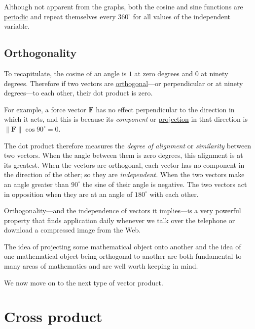 \documentclass[
  a4paper,
]{article}
\begin{document}
Although not apparent from the graphs, both the cosine and sine
functions are
\href{http://mathworld.wolfram.com/PeriodicFunction.html}{periodic} and
repeat themselves every \(360^{\circ}\) for all values of the
independent variable.

\hypertarget{orthogonality}{%
\subsection{Orthogonality}\label{orthogonality}}

To recapitulate, the cosine of an angle is \(1\) at zero degrees and
\(0\) at ninety degrees. Therefore if two vectors are
\href{http://mathworld.wolfram.com/Orthogonal.html}{orthogonal}---or
perpendicular or at ninety degrees---to each other, their dot product is
zero.

For example, a force vector \(\mathbf{F}\) has no effect perpendicular
to the direction in which it acts, and this is because its
\emph{component} or
\href{http://en.wikipedia.org/wiki/Vector_projection}{projection} in
that direction is \(\lVert\mathbf{F}\rVert\cos 90^{\circ} = 0\).

The dot product therefore measures the \emph{degree of alignment} or
\emph{similarity} between two vectors. When the angle between them is
zero degrees, this alignment is at its greatest. When the vectors are
orthogonal, each vector has no component in the direction of the other;
so they are \emph{independent.} When the two vectors make an angle
greater than \(90^{\circ}\) the sine of their angle is negative. The two
vectors act in opposition when they are at an angle of \(180^{\circ}\)
with each other.

Orthogonality---and the independence of vectors it implies---is a very
powerful property that finds application daily whenever we talk over the
telephone or download a compressed image from the Web.

The idea of projecting some mathematical object onto another and the
idea of one mathematical object being orthogonal to another are both
fundamental to many areas of mathematics and are well worth keeping in
mind.

We now move on to the next type of vector product.

\hypertarget{cross-product}{%
\section{Cross product}\label{cross-product}}
\end{document}
